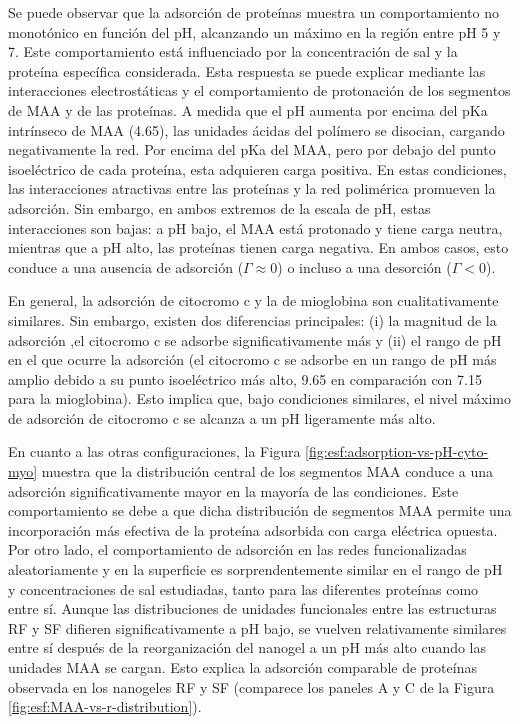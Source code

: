  Se puede observar que la adsorci\'on de prote\'inas muestra un comportamiento no monot\'onico en funci\'on del pH, alcanzando un m\'aximo en la regi\'on entre pH 5 y 7. Este comportamiento est\'a influenciado por la concentraci\'on de sal y la prote\'ina espec\'ifica considerada. Esta respuesta se puede explicar mediante las interacciones electrost\'aticas y el comportamiento de protonaci\'on de los segmentos de MAA y de las prote\'inas. A medida que el pH aumenta por encima del pKa intr\'inseco de MAA (4.65), las unidades \'acidas del pol\'imero se disocian, cargando negativamente la red. Por encima del pKa del MAA, pero por debajo del punto isoel\'ectrico de cada prote\'ina, esta adquieren carga positiva. En estas condiciones, las interacciones atractivas entre las prote\'inas y la red polim\'erica promueven la adsorci\'on. Sin embargo, en ambos extremos de la escala de pH, estas interacciones son bajas: a pH bajo, el MAA est\'a protonado y tiene carga neutra, mientras que a pH alto, las prote\'inas tienen carga negativa. En ambos casos, esto conduce a una ausencia de adsorci\'on ($\Gamma \approx 0$) o incluso a una desorci\'on ($\Gamma < 0$).
 
 
En general, la adsorci\'on de citocromo c y la de mioglobina son cualitativamente similares. Sin embargo, existen dos diferencias principales: (i) la magnitud de la adsorci\'on ,el citocromo c se adsorbe significativamente m\'as y (ii) el rango de pH en el que ocurre la adsorci\'on (el citocromo c se adsorbe en un rango de pH m\'as amplio debido a su punto isoel\'ectrico m\'as alto, 9.65 en comparaci\'on con 7.15 para la mioglobina). Esto implica que, bajo condiciones similares, el nivel m\'aximo de adsorci\'on de citocromo c se alcanza a un pH ligeramente m\'as alto.

En cuanto a las otras configuraciones, la Figura \ref{fig:esf:adsorption-vs-pH-cyto-myo} muestra que la distribuci\'on central de los segmentos MAA conduce a una adsorci\'on significativamente mayor en la mayor\'ia de las condiciones. Este comportamiento se debe a que dicha distribuci\'on de segmentos MAA permite una incorporaci\'on m\'as efectiva de la prote\'ina adsorbida con carga el\'ectrica opuesta. Por otro lado, el comportamiento de adsorci\'on en las redes funcionalizadas aleatoriamente y en la superficie es sorprendentemente similar en el rango de pH y concentraciones de sal estudiadas, tanto para las diferentes prote\'inas como entre s\'i. Aunque las distribuciones de unidades funcionales entre las estructuras RF y SF difieren significativamente a pH bajo, se vuelven relativamente similares entre s\'i despu\'es de la reorganizaci\'on del nanogel a un pH m\'as alto cuando las unidades MAA se cargan. Esto explica la adsorci\'on comparable de prote\'inas observada en los nanogeles RF y SF (comparece los paneles A y C de la Figura \ref{fig:esf:MAA-vs-r-distribution}).




